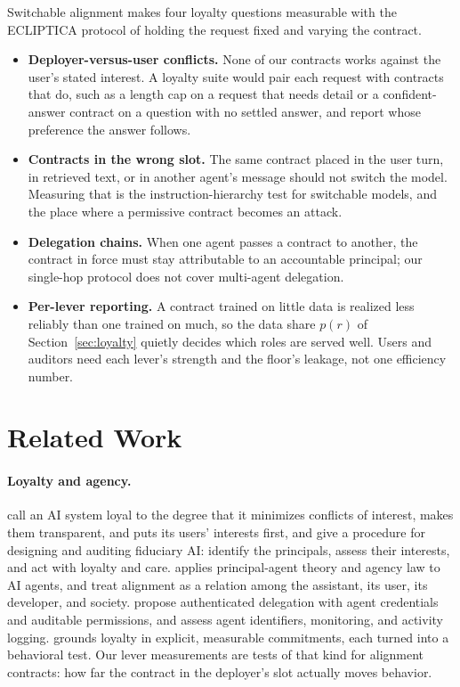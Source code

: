 \documentclass[letterpaper]{article} %
\begin{document}
Switchable alignment makes four loyalty questions measurable with the ECLIPTICA protocol of holding the request fixed and varying the contract.
\begin{itemize}
    \item \textbf{Deployer-versus-user conflicts.} None of our contracts works against the user's stated interest. A loyalty suite would pair each request with contracts that do, such as a length cap on a request that needs detail or a confident-answer contract on a question with no settled answer, and report whose preference the answer follows.
    \item \textbf{Contracts in the wrong slot.} The same contract placed in the user turn, in retrieved text, or in another agent's message should not switch the model. Measuring that is the instruction-hierarchy test \cite{wallace2024instruction} for switchable models, and the place where a permissive contract becomes an attack.
    \item \textbf{Delegation chains.} When one agent passes a contract to another, the contract in force must stay attributable to an accountable principal; our single-hop protocol does not cover multi-agent delegation.
    \item \textbf{Per-lever reporting.} A contract trained on little data is realized less reliably than one trained on much, so the data share $p(r)$ of Section~\ref{sec:loyalty} quietly decides which roles are served well. Users and auditors need each lever's strength and the floor's leakage, not one efficiency number.
\end{itemize}

\section{Related Work}
\label{sec:related}

\paragraph{Loyalty and agency.}
\citet{aguirre2020loyalty} call an AI system loyal to the degree that it minimizes conflicts of interest, makes them transparent, and puts its users' interests first, and \citet{benthall2023fiduciary} give a procedure for designing and auditing fiduciary AI: identify the principals, assess their interests, and act with loyalty and care. \citet{kolt2025governing} applies principal-agent theory and agency law to AI agents, and \citet{gabriel2024ethics} treat alignment as a relation among the assistant, its user, its developer, and society. \citet{south2025authenticated} propose authenticated delegation with agent credentials and auditable permissions, and \citet{chan2024visibility} assess agent identifiers, monitoring, and activity logging. \citet{greenwood2026loyalevals} grounds loyalty in explicit, measurable commitments, each turned into a behavioral test. Our lever measurements are tests of that kind for alignment contracts: how far the contract in the deployer's slot actually moves behavior.
\end{document}
